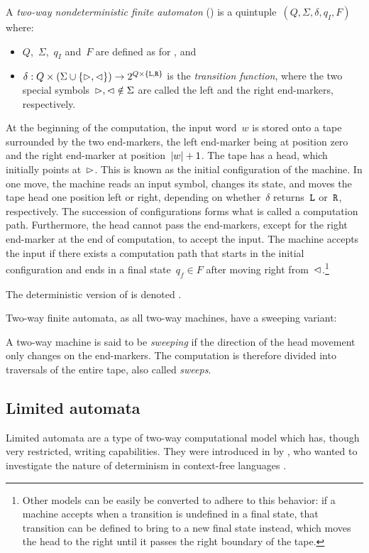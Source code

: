 \begin{defn}
	A \emph{two-way nondeterministic finite automaton} (\TNFA) is a quintuple~$(Q,\Sigma,\delta,q_I,F)$ where:
	\begin{itemize}
		\item $Q$,~$\Sigma$,~$q_I$ and~$F$ are defined as for \ONFAs, and
		\item $\delta:Q\times(\Sigma\cup\{\rhd,\lhd\})\to2^{Q\times\{\mathtt L,\mathtt R\}}$ is the \emph{transition function}, where the two special symbols~$\rhd,\lhd\notin\Sigma$ are called the left and the right end-markers, respectively.
	\end{itemize}
	At the beginning of the computation, the input word~$w$ is stored onto a tape surrounded by the two end-markers, the left end-marker being at position zero and the right end-marker at position~$\lvert w \rvert+1$.
	The tape has a head, which initially points at~$\rhd$.
	This is known as the initial configuration of the machine.
	In one move, the machine reads an input symbol, changes its state, and moves the tape head one position left or right, depending on whether~$\delta$ returns~$\mathtt L$ or~$\mathtt R$, respectively.
	The succession of configurations forms what is called a computation path.
	Furthermore, the head cannot pass the end-markers, except for the right end-marker at the end of computation, to accept the input.
	The machine accepts the input if there exists a computation path that starts in the initial configuration and ends in a final state~$q_f\in F$ after moving right from~$\lhd$.\footnote{%
	Other models can be easily be converted to adhere to this behavior: if a machine accepts when a transition is undefined in a final state, that transition can be defined to bring to a new final state instead, which moves the head to the right until it passes the right boundary of the tape.}

	\noindent The deterministic version of \TNFAs is denoted \TDFAs.
\end{defn}

Two-way finite automata, as all two-way machines, have a sweeping variant:
\begin{defn}\label{def:sweeping}
	A two-way machine is said to be \emph{sweeping} if the direction of the head movement only changes on the end-markers.
	The computation is therefore divided into traversals of the entire tape, also called \emph{sweeps}.
\end{defn}


\subsection{Limited automata}
Limited automata are a type of two-way computational model which has, though very restricted, writing capabilities.
They were introduced in \citeyear{Hib67} by \citeauthor{Hib67}, who wanted to investigate the nature of determinism in context-free languages \cite{Hib67}.

